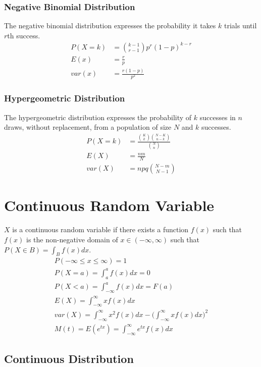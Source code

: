 \documentclass[12pt]{article}
\begin{document}
\subsubsection{Negative Binomial Distribution}
The negative binomial distribution expresses the probability it takes $k$ trials until $r$th success.
\begin{align*}
	P(X=k) &= \binom{k-1}{r-1}p^r (1-p)^{k-r} \\
	E(x) &= \frac{r}{p} \\
	var(x) &= \frac{r(1-p)}{p^2}
\end{align*}

\subsubsection{Hypergeometric Distribution}
The hypergeometric distribution expresses the probability of $k$ successes in $n$ draws, without replacement, from a population of size $N$ and $k$ successes.
\begin{align*}
	P(X=k) &= \frac{\binom{K}{k}\binom{N-K}{n-k}}{\binom{N}{n}} \\
	E(X) &= \frac{nm}{N} \\
	var(X) &= npq\binom{N-m}{N-1}
\end{align*} 

\section{Continuous Random Variable}
$X$ is a continuous random variable if there exists a function $f(x)$ such that $f(x)$ is the non-negative domain of $x\in (-\infty, \infty)$ such that $P(X\in B) = \int_B f(x)dx$.
\begin{align*}
	P(-\infty\le x \le\infty) = 1 \\
	P(X = a) = \int_{a}^{a}f(x)dx=0 \\
	P(X<a) = \int_{-\infty}^{a}f(x)dx = F(a) \\
	E(X) = \int_{-\infty}^{\infty}xf(x)dx \\
	var(X) = \int_{-\infty}^{\infty}x^2 f(x)dx - \bigg(\int_{-\infty}^{\infty}x f(x)dx\bigg)^2 \\
	M(t) = E(e^{tx}) = \int_{-\infty}^{\infty}e^{tx} f(x)dx
\end{align*}

\subsection{Continuous Distribution}
\end{document}

